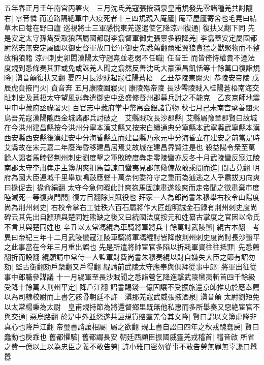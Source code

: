 五年春正月壬午南宫丙署火　三月沈氐羌寇張掖酒泉皇甫規發先零諸種羌共討隴右|{
	零音憐}
而道路隔絶軍中大疫死者十三四規親入庵廬|{
	庵草屋廬寄舍也毛晃曰結草木曰菴在野曰廬}
巡視將士三軍感悦東羌遂遣使乞降涼州復通|{
	復扶乂翻下同}
先是安定太守孫雋受取狼藉屬國都尉李翕督軍御史張禀多殺降羌|{
	李翕蓋安定屬國都尉然志無安定屬國以御史督軍故曰督軍御史先悉薦翻爾雅翼狼貪猛之獸聚物而不整故稱狼籍}
涼州刺史郭閎漢陽太守趙熹並老弱不任職|{
	任音壬}
而皆倚恃權貴不遵法度規到悉條奏其罪或免或誅羌人聞之翕然反善沈氐大豪滇昌飢恬等十餘萬口復詣規降|{
	滇音顛復扶又翻}
夏四月長沙賊起寇桂陽蒼梧　乙丑恭陵東闕火|{
	恭陵安帝陵}
戊辰虎賁掖門火|{
	賁音奔}
五月康陵園寢火|{
	康陵殤帝陵}
長沙零陵賊入桂陽蒼梧南海交趾刺史及蒼梧太守望風逃犇遣御史中丞盛修督州郡募兵討之不能克　乙亥京師地震　甲申中藏府丞祿署火|{
	百官志中藏府掌中幣帛金銀諸貨物}
秋七月己未南宫承善闥火　鳥吾羌寇漢陽隴西金城諸郡兵討破之　艾縣賊攻長沙郡縣|{
	艾縣屬豫章郡賢曰故城在今洪州建昌縣按今洪州分寧本漢艾縣又按宋白續通典分寧縣本武寧縣武寧縣本漢西安縣西安縣後漢建安中分海昏縣立而建昌縣乃永元中分海昏立在建安之前當是時艾縣故在宋元嘉二年廢海昏移建昌居焉艾故城在建昌界賢注是也}
殺益陽令衆至萬餘人謁者馬睦督荆州刺史劉度撃之軍敗睦度犇走零陵蠻亦反冬十月武陵蠻反寇江陵南郡太守李肅犇走主簿胡爽扣馬首諫曰蠻夷見郡無儆備故敢乘間而進|{
	間古莧翻}
明府為國大臣連城千里舉旗鳴鼓應聲十萬奈何委符守之重而為逋逃之人乎肅拔刃向爽曰掾促去|{
	掾俞絹翻}
太守今急何暇此計爽抱馬固諫肅遂殺爽而走帝聞之徵肅棄市度睦減死一等復爽門閭|{
	復方目翻除其賦役也}
拜家一人為郎尚書朱穆舉右校令山陽度尚為荆州刺史|{
	右校令掌右工徒秩六百石屬將作大匠趙明誠金石録有荆州刺史度尚碑云其先出自顓頊與楚同姓熊缺之後又曰統國法度按元和姓纂古掌度之官因以命氏不言其與楚同姓也}
辛丑以太常馮緄為車騎將軍將兵十餘萬討武陵蠻|{
	緄古本翻　考異曰帝紀三年十二月武陵蠻寇江陵車騎將軍馮緄討皆降散荆州刺史度尚討長沙蠻平之此事當在今年三月重出誤也}
先是所遣將帥宦官多陷以折耗軍資往往抵罪|{
	先悉薦翻折而設翻}
緄願請中常侍一人監軍財費尚書朱穆奏緄以財自嫌失大臣之節有詔勿劾|{
	監古衘翻劾戶槩翻又戶得翻}
緄請前武陵太守應奉與俱拜從事中郎|{
	將軍出征從事中郎職參謀議}
十一月緄軍至長沙賊聞之悉詣營乞降進撃武陵蠻夷斬首四千餘級受降十餘萬人荆州平定|{
	降戶江翻}
詔書賜錢一億固讓不受振旅還京師推功於應奉薦以為司隸校尉而上書乞骸骨朝廷不許　滇那羌寇武威張掖酒泉|{
	滇音顛}
太尉劉矩免以太常楊秉為太尉　皇甫規持節為將還督鄉里既無他私惠而多所舉奏又惡絶宦官不與交通|{
	惡烏路翻}
於是中外並怨遂共誣規貨賂羣羌令其文降|{
	賢曰謂以文簿虚降非真心也降戶江翻}
帝璽書誚讓相屬|{
	屬之欲翻}
規上書自訟曰四年之秋戎醜蠢戾|{
	賢曰蠢動也戾乖也}
舊都懼駭|{
	舊都謂長安}
朝廷西顧臣振國威靈羌戎稽首|{
	稽音啟}
所省之費一億以上以為忠臣之義不敢告勞|{
	詩小雅曰密勿從事不敢告勞無罪無辜讒口囂囂}

